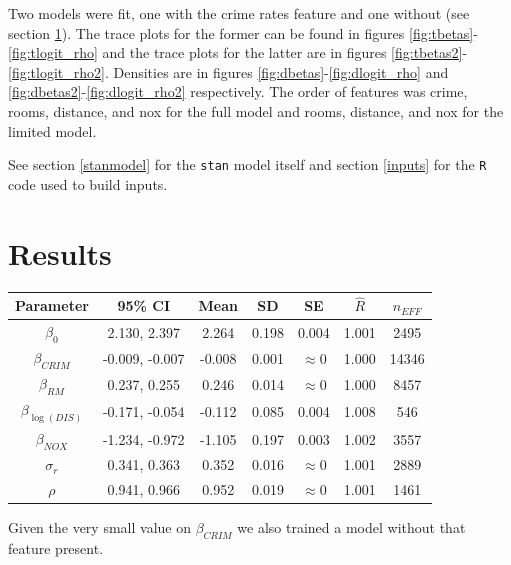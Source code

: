 \documentclass[11pt]{article}
\newcommand{\code}[1]{\colorbox{light-gray}{\texttt{#1}}}
\begin{document}
Two models were fit, one with the crime rates feature and one without (see section \ref{results}). The trace plots for the former can be found in figures \ref{fig:tbetas}-\ref{fig:tlogit_rho} and the trace plots for the latter are in figures \ref{fig:tbetas2}-\ref{fig:tlogit_rho2}. Densities are in figures \ref{fig:dbetas}-\ref{fig:dlogit_rho} and \ref{fig:dbetas2}-\ref{fig:dlogit_rho2} respectively. The order of features was crime, rooms, distance, and nox for the full model and rooms, distance, and nox for the limited model. \newline

See section \ref{stanmodel} for the \code{stan} model itself and section \ref{inputs} for the \code{R} code used to build inputs. 


\section{Results} \label{results}


\begin{center}
\begin{tabular}{ c  | c | c | c | c | c | c}
\hline
 Parameter & 95\% CI & Mean & SD & SE & $\hat{R}$ & $n_{EFF}$ \\ 
 \hline
 $\beta_0$ & 2.130, 2.397 & 2.264 & 0.198 & 0.004 & 1.001 & 2495 \\
 $\beta_{CRIM}$ & -0.009, -0.007 & -0.008 & 0.001 & $\approx 0$ & 1.000 & 14346  \\
 $\beta_{RM}$ & 0.237, 0.255 & 0.246 & 0.014 & $\approx 0$  & 1.000 & 8457 \\
 $\beta_{\log{(DIS)}}$ & -0.171, -0.054 & -0.112 & 0.085 & 0.004 & 1.008 & 546 \\
 $\beta_{NOX}$ & -1.234, -0.972 & -1.105 & 0.197 & 0.003 & 1.002 & 3557 \\
 $\sigma_r$ & 0.341, 0.363 & 0.352 & 0.016 & $\approx 0$ & 1.001 & 2889 \\
$\rho$ & 0.941, 0.966 & 0.952 & 0.019 & $\approx 0$ & 1.001 & 1461\\
\hline
\end{tabular}
\end{center}

Given the very small value on $\beta_{CRIM}$ we also trained a model without that feature present. 
\end{document}
